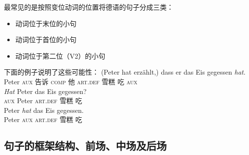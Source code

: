 最常见的是按照变位动词的位置将德语的句子分成三类：
\begin{itemize}
\item 动词位于末位的小句
\item 动词位于首位的小句
\item 动词位于第二位（V2）的小句
\end{itemize}
%
下面的例子说明了这些可能性：
\eal
\ex 
\gll (Peter hat erzählt,) dass er das Eis gegessen \emph{hat}.\\
     Peter  \textsc{aux} 告诉 \textsc{comp} 他 \textsc{art}.\textsc{def} 雪糕 吃 \textsc{aux}\\
\ex 
\gll \emph{Hat} Peter das Eis gegessen?\\
	 \textsc{aux} Peter \textsc{art}.\textsc{def} 雪糕 吃\\
\ex 
\gll Peter \emph{hat} das Eis gegessen.\\
	 Peter \textsc{aux} \textsc{art}.\textsc{def} 雪糕 吃\\
\zl

\subsection{句子的框架结构、前场、中场及后场}

